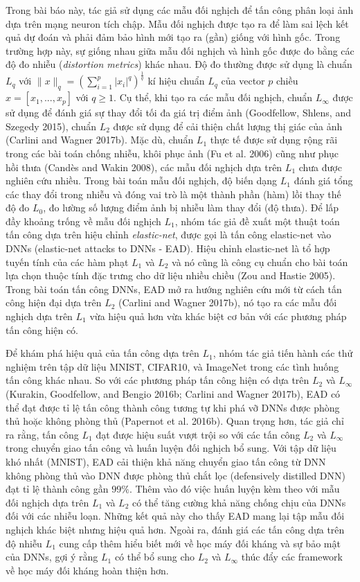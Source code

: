 Trong bài báo này, tác giả sử dụng các mẫu đối nghịch để tấn công phân loại ảnh dựa trên 
mạng neuron tích chập. Mẫu đối nghịch được tạo ra để làm sai lệch kết quả dự đoán và phải đảm bảo
hình mới tạo ra (gần) giống với hình gốc. Trong trường hợp này, sự giống nhau giữa mẫu đối nghịch và hình gốc được đo bằng các độ đo nhiễu (\textit{distortion metrics}) khác nhau.
Độ đo thường được sử dụng là chuẩn $L_q$ 
với $\lVert x \rVert_q = \left( \sum_{i=1}^p |x_i|^q \right)^{\frac{1}{q}}$ kí hiệu chuẩn $L_q$
của vector $p$ chiều $x = [x_1, ..., x_p]$ với $q \geq 1$. Cụ thể, khi tạo ra các mẫu đối nghịch, chuẩn $L_{\infty}$ được sử dụng để đánh giá sự thay đổi tối đa giá trị điểm ảnh (Goodfellow, 
Shlens, and Szegedy 2015), chuẩn $L_2$ được sử dụng để cải thiện chất lượng thị giác của 
ảnh (Carlini and Wagner 2017b). Mặc dù, chuẩn $L_1$ thực tế được sử dụng rộng rãi 
trong các bài toán chống nhiễu, khôi phục ảnh (Fu et al. 2006) cũng như phục hồi thưa (Candès and Wakin 2008), các mẫu đối nghịch dựa trên $L_1$ chưa được nghiên cứu nhiều. Trong bài toán mẫu đối nghịch,
độ biến dạng $L_1$ đánh giá tổng các thay đổi trong nhiễu và đóng vai trò là một thành phần
(hàm) lồi thay thế độ đo $L_0$, đo lường số lượng điểm ảnh bị nhiễu làm thay đổi (độ thưa). Để lấp đầy khoảng trống về mẫu đối nghịch $L_1$, nhóm tác giả đề xuất một thuật toán tấn công dựa trên hiệu chỉnh \textit{elastic-net}, được 
gọi là tấn công elastic-net vào DNNs (elastic-net attacks to DNNs - EAD). Hiệu chỉnh 
elastic-net là tổ hợp tuyến tính của các hàm phạt $L_1$ và $L_2$ và nó cũng là công cụ 
chuẩn cho bài toán lựa chọn thuộc tính đặc trưng cho dữ liệu nhiều chiều (Zou and Hastie 2005). 
Trong bài toán tấn công DNNs, EAD mở ra hướng nghiên cứu mới từ cách tấn công hiện đại dựa trên 
$L_2$ (Carlini and Wagner 2017b), nó tạo ra các mẫu đối nghịch dựa trên $L_1$ vừa hiệu quả hơn vừa khác biệt cơ bản với các phương pháp tấn công hiện có. 

Để khám phá hiệu quả của tấn công dựa trên $L_1$, nhóm tác giả tiến hành các thử nghiệm trên tập 
dữ liệu MNIST, CIFAR10, và ImageNet trong các tình huống tấn công khác nhau. So với các 
phương pháp tấn công hiện có dựa trên $L_2$ và $L_{\infty}$ (Kurakin, Goodfellow, and 
Bengio 2016b; Carlini and Wagner 2017b), EAD có thể đạt được tỉ lệ tấn công thành công tương 
tự khi phá vỡ DNNs được phòng thủ hoặc không phòng thủ (Papernot et al. 2016b). Quan trọng 
hơn, tác giả chỉ ra rằng, tấn công $L_1$ đạt được hiệu suất vượt trội so với các tấn
công $L_2$ và $L_{\infty}$ trong chuyển giao tấn công và huấn luyện đối nghịch bổ sung. Với tập dữ liệu khó nhất (MNIST), EAD cải thiện khả năng chuyển 
giao tấn công từ DNN không phòng thủ vào DNN được phòng thủ chắt lọc (defensively distilled DNN) đạt tỉ lệ thành công gần $99\%$. Thêm vào 
đó việc huấn luyện kèm theo với mẫu đối nghịch dựa trên $L_1$ và $L_2$ có thể tăng cường khả 
năng chống chịu của DNNs đối với các nhiễu loạn. Những kết quả này cho thấy EAD mang lại tập 
mẫu đối nghịch khác biệt nhưng hiệu quả hơn. Ngoài ra, đánh giá các tấn công dựa trên 
độ nhiễu $L_1$ cung cấp thêm hiểu biết mới về học máy đối kháng và sự bảo mật của DNNs, gợi 
ý rằng $L_1$ có thể bổ sung cho $L_2$ và $L_{\infty}$ thúc đẩy các framework về học máy đối 
kháng hoàn thiện hơn.
